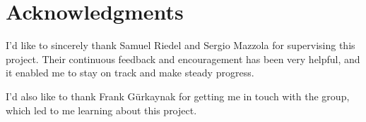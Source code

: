 \chapter*{Acknowledgments}

I'd like to sincerely thank Samuel Riedel and Sergio Mazzola for supervising this project. Their
continuous feedback and encouragement has been very helpful, and it enabled me to stay on track and
make steady progress.

I'd also like to thank Frank Gürkaynak for getting me in touch with the group, which led to me
learning about this project.
